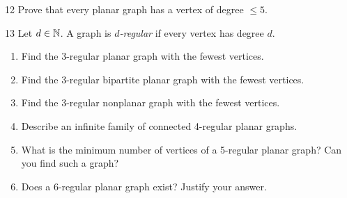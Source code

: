 \begin{exercise}{12}
    Prove that every planar graph has a vertex of degree $\le5$.
\end{exercise}

\begin{exercise}{13}
    Let $d\in\mathbb{N}$. A graph is \emph{$d$-regular} if every vertex has degree $d$.
    \begin{enumerate}[label=(\alph*)]
        \item Find the 3-regular planar graph with the fewest vertices.
        \item Find the 3-regular bipartite planar graph with the fewest vertices.
        \item Find the 3-regular nonplanar graph with the fewest vertices.
        \item Describe an infinite family of connected 4-regular planar graphs.
        \item What is the minimum number of vertices of a 5-regular planar graph?
              Can you find such a graph?
        \item Does a 6-regular planar graph exist? Justify your answer.
    \end{enumerate}
\end{exercise}
